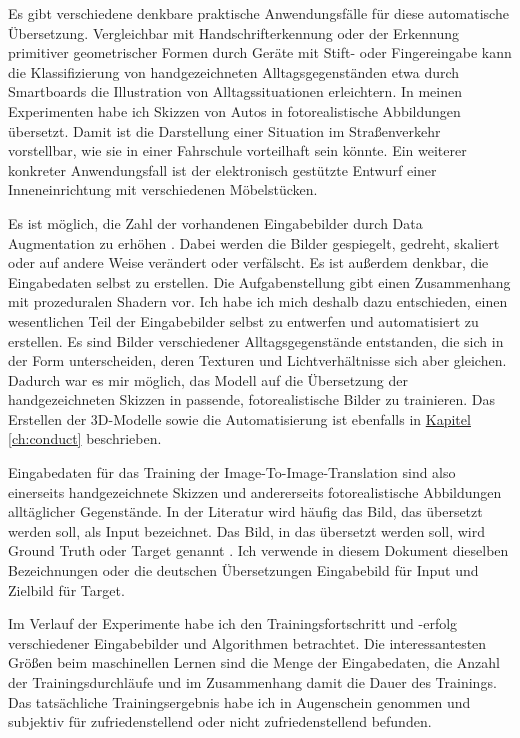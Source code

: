 Es gibt verschiedene denkbare praktische Anwendungsfälle für diese automatische Übersetzung. Vergleichbar mit Handschrifterkennung oder der Erkennung primitiver geometrischer Formen durch Geräte mit Stift- oder Fingereingabe kann die Klassifizierung von handgezeichneten Alltagsgegenständen etwa durch Smartboards die Illustration von Alltagssituationen erleichtern. In meinen Experimenten habe ich Skizzen von Autos in fotorealistische Abbildungen übersetzt. Damit ist die Darstellung einer Situation im Straßenverkehr vorstellbar, wie sie in einer Fahrschule vorteilhaft sein könnte. Ein weiterer konkreter Anwendungsfall ist der elektronisch gestützte Entwurf einer Inneneinrichtung mit verschiedenen Möbelstücken.

Es ist möglich, die Zahl der vorhandenen Eingabebilder durch Data Augmentation zu erhöhen \cite{chollet2021deep}. Dabei werden die Bilder gespiegelt, gedreht, skaliert oder auf andere Weise verändert oder verfälscht. Es ist außerdem denkbar, die Eingabedaten selbst zu erstellen. Die Aufgabenstellung gibt einen Zusammenhang mit prozeduralen Shadern vor. Ich habe ich mich deshalb dazu entschieden, einen wesentlichen Teil der Eingabebilder selbst zu entwerfen und automatisiert zu erstellen. Es sind Bilder verschiedener Alltagsgegenstände entstanden, die sich in der Form unterscheiden, deren Texturen und Lichtverhältnisse sich aber gleichen. Dadurch war es mir möglich, das Modell auf die Übersetzung der handgezeichneten Skizzen in passende, fotorealistische Bilder zu trainieren. Das Erstellen der 3D-Modelle sowie die Automatisierung ist ebenfalls in \hyperref[ch:conduct]{Kapitel \ref{ch:conduct}} beschrieben.

Eingabedaten für das Training der Image-To-Image-Translation sind also einerseits handgezeichnete Skizzen und andererseits fotorealistische Abbildungen alltäglicher Gegenstände. In der Literatur wird häufig das Bild, das übersetzt werden soll, als Input bezeichnet. Das Bild, in das übersetzt werden soll, wird Ground Truth oder Target genannt \cite{chollet2021deep}. Ich verwende in diesem Dokument dieselben Bezeichnungen oder die deutschen Übersetzungen Eingabebild für Input und Zielbild für Target.

Im Verlauf der Experimente habe ich den Trainingsfortschritt und -erfolg verschiedener Eingabebilder und Algorithmen betrachtet. Die interessantesten Größen beim maschinellen Lernen sind die Menge der Eingabedaten, die Anzahl der Trainingsdurchläufe und im Zusammenhang damit die Dauer des Trainings. Das tatsächliche Trainingsergebnis habe ich in Augenschein genommen und subjektiv für zufriedenstellend oder nicht zufriedenstellend befunden.

